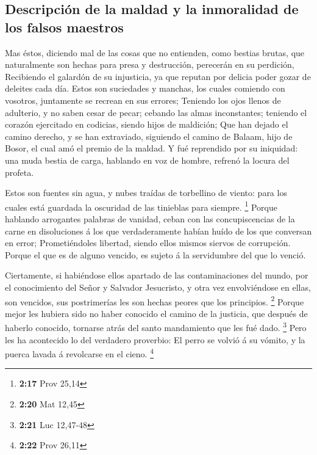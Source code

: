 \hypertarget{descripciuxf3n-de-la-maldad-y-la-inmoralidad-de-los-falsos-maestros}{%
\subsection{Descripción de la maldad y la inmoralidad de los falsos
maestros}\label{descripciuxf3n-de-la-maldad-y-la-inmoralidad-de-los-falsos-maestros}}

 Mas éstos, diciendo mal de las cosas que no entienden,
como bestias brutas, que naturalmente son hechas para presa y
destrucción, perecerán en su perdición,  Recibiendo el
galardón de su injusticia, ya que reputan por delicia poder gozar de
deleites cada día. Estos son suciedades y manchas, los cuales comiendo
con vosotros, juntamente se recrean en sus errores; 
Teniendo los ojos llenos de adulterio, y no saben cesar de pecar;
cebando las almas inconstantes; teniendo el corazón ejercitado en
codicias, siendo hijos de maldición;  Que han dejado el
camino derecho, y se han extraviado, siguiendo el camino de Balaam, hijo
de Bosor, el cual amó el premio de la maldad.  Y fué
reprendido por su iniquidad: una muda bestia de carga, hablando en voz
de hombre, refrenó la locura del profeta.

 Estos son fuentes sin agua, y nubes traídas de
torbellino de viento: para los cuales está guardada la oscuridad de las
tinieblas para siempre. \footnote{\textbf{2:17} Prov 25,14}
 Porque hablando arrogantes palabras de vanidad, ceban
con las concupiscencias de la carne en disoluciones á los que
verdaderamente habían huído de los que conversan en error;
 Prometiéndoles libertad, siendo ellos mismos siervos de
corrupción. Porque el que es de alguno vencido, es sujeto á la
servidumbre del que lo venció.

 Ciertamente, si habiéndose ellos apartado de las
contaminaciones del mundo, por el conocimiento del Señor y Salvador
Jesucristo, y otra vez envolviéndose en ellas, son vencidos, sus
postrimerías les son hechas peores que los principios. \footnote{\textbf{2:20}
  Mat 12,45}  Porque mejor les hubiera sido no haber
conocido el camino de la justicia, que después de haberlo conocido,
tornarse atrás del santo mandamiento que les fué dado. \footnote{\textbf{2:21}
  Luc 12,47-48}  Pero les ha acontecido lo del verdadero
proverbio: El perro se volvió á su vómito, y la puerca lavada á
revolcarse en el cieno. \footnote{\textbf{2:22} Prov 26,11}


